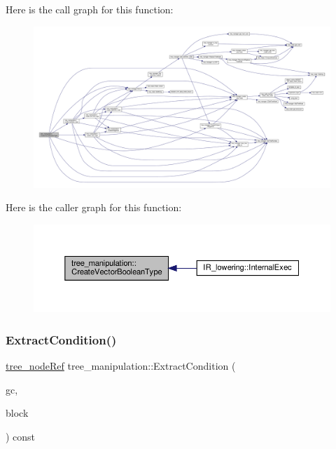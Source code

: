 Here is the call graph for this function\+:
\nopagebreak
\begin{figure}[H]
\begin{center}
\leavevmode
\includegraphics[width=350pt]{d0/d99/classtree__manipulation_a29640c2e27ae3aafa292806da7921110_cgraph}
\end{center}
\end{figure}
Here is the caller graph for this function\+:
\nopagebreak
\begin{figure}[H]
\begin{center}
\leavevmode
\includegraphics[width=350pt]{d0/d99/classtree__manipulation_a29640c2e27ae3aafa292806da7921110_icgraph}
\end{center}
\end{figure}
\mbox{\label{classtree__manipulation_a2c1beb9fa7745637dbc9e90f249432ae}} 
\subsubsection{\texorpdfstring{Extract\+Condition()}{ExtractCondition()}}
{\footnotesize\ttfamily \hyperlink{tree__node_8hpp_a6ee377554d1c4871ad66a337eaa67fd5}{tree\+\_\+node\+Ref} tree\+\_\+manipulation\+::\+Extract\+Condition (\begin{DoxyParamCaption}\item[{const \hyperlink{tree__node_8hpp_a6ee377554d1c4871ad66a337eaa67fd5}{tree\+\_\+node\+Ref} \&}]{gc,  }\item[{const bloc\+Ref \&}]{block }\end{DoxyParamCaption}) const}



